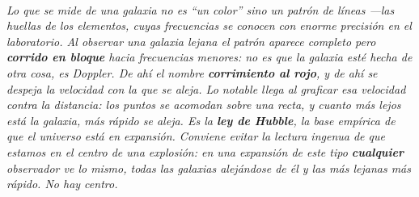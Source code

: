 \begin{center}
\begin{tikzpicture}[scale=0.95, transform shape]
\end{tikzpicture}\\[0.5em]
{\small\itshape Lo que se mide de una galaxia no es \enquote{un color} sino un
patrón de líneas ---las huellas de los elementos, cuyas frecuencias se conocen
con enorme precisión en el laboratorio. Al observar una galaxia lejana el patrón
aparece completo pero \textbf{corrido en bloque} hacia frecuencias menores: no
es que la galaxia esté hecha de otra cosa, es Doppler. De ahí el nombre
\textbf{corrimiento al rojo}, y de ahí se despeja la velocidad con la que se
aleja. Lo notable llega al graficar esa velocidad contra la distancia: los
puntos se acomodan sobre una recta, y cuanto más lejos está la galaxia, más
rápido se aleja. Es la \textbf{ley de Hubble}, la base empírica de que el
universo está en expansión. Conviene evitar la lectura ingenua de que estamos en
el centro de una explosión: en una expansión de este tipo \textbf{cualquier}
observador ve lo mismo, todas las galaxias alejándose de él y las más lejanas
más rápido. No hay centro.}
\end{center}
